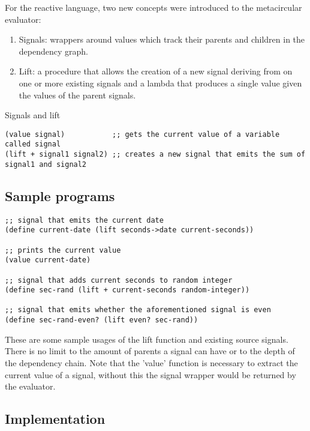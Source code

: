 \newpage
For the reactive language, two new concepts were introduced to the metacircular evaluator:

\begin{enumerate}
	\item Signals: wrappers around values which track their parents and children in the dependency graph. 
	\item Lift: a procedure that allows the creation of a new signal deriving from on one or more existing signals and a lambda that produces a single value given the values of the parent signals.
\end{enumerate}

Signals and lift
\begin{lstlisting}
(value signal)           ;; gets the current value of a variable called signal
(lift + signal1 signal2) ;; creates a new signal that emits the sum of signal1 and signal2
\end{lstlisting}

\subsection{Sample programs}

\begin{lstlisting}
;; signal that emits the current date
(define current-date (lift seconds->date current-seconds)) 

;; prints the current value
(value current-date)       

;; signal that adds current seconds to random integer                                
(define sec-rand (lift + current-seconds random-integer))  

;; signal that emits whether the aforementioned signal is even
(define sec-rand-even? (lift even? sec-rand))			   
\end{lstlisting}

These are some sample usages of the lift function and existing source signals. There is no limit to the amount of parents a signal can have or to the depth of the dependency chain. Note that the 'value' function is necessary to extract the current value of a signal, without this the signal wrapper would be returned by the evaluator. 

\newpage
\subsection{Implementation}

